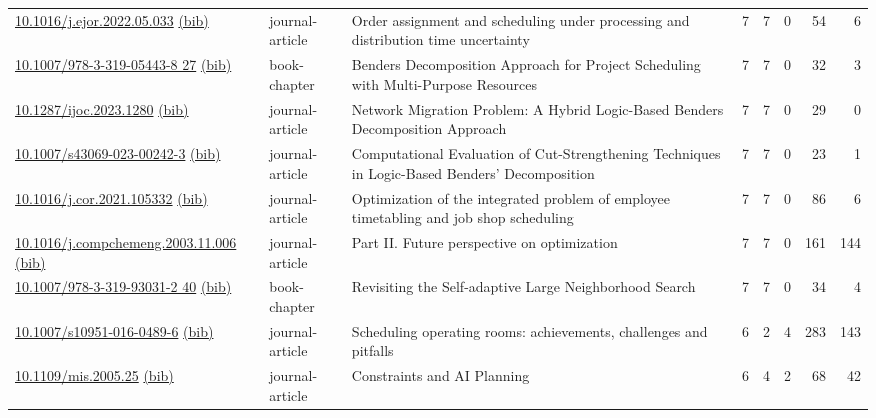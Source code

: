 {\begin{longtable}{p{5cm}lp{11cm}rrrrr}
\href{http://dx.doi.org/10.1016/j.ejor.2022.05.033}{10.1016/j.ejor.2022.05.033} \href{https://www.doi2bib.org/bib/10.1016/j.ejor.2022.05.033}{(bib)} & journal-article & Order assignment and scheduling under processing and distribution time uncertainty & 7 & 7 & 0 & 54 & 6 \\
\href{http://dx.doi.org/10.1007/978-3-319-05443-8_27}{10.1007/978-3-319-05443-8 27} \href{https://www.doi2bib.org/bib/10.1007/978-3-319-05443-8_27}{(bib)} & book-chapter & Benders Decomposition Approach for Project Scheduling with Multi-Purpose Resources & 7 & 7 & 0 & 32 & 3 \\
\href{http://dx.doi.org/10.1287/ijoc.2023.1280}{10.1287/ijoc.2023.1280} \href{https://www.doi2bib.org/bib/10.1287/ijoc.2023.1280}{(bib)} & journal-article & Network Migration Problem: A Hybrid Logic-Based Benders Decomposition Approach & 7 & 7 & 0 & 29 & 0 \\
\href{http://dx.doi.org/10.1007/s43069-023-00242-3}{10.1007/s43069-023-00242-3} \href{https://www.doi2bib.org/bib/10.1007/s43069-023-00242-3}{(bib)} & journal-article & Computational Evaluation of Cut-Strengthening Techniques in Logic-Based Benders' Decomposition & 7 & 7 & 0 & 23 & 1 \\
\href{http://dx.doi.org/10.1016/j.cor.2021.105332}{10.1016/j.cor.2021.105332} \href{https://www.doi2bib.org/bib/10.1016/j.cor.2021.105332}{(bib)} & journal-article & Optimization of the integrated problem of employee timetabling and job shop scheduling & 7 & 7 & 0 & 86 & 6 \\
\href{http://dx.doi.org/10.1016/j.compchemeng.2003.11.006}{10.1016/j.compchemeng.2003.11.006} \href{https://www.doi2bib.org/bib/10.1016/j.compchemeng.2003.11.006}{(bib)} & journal-article & Part II. Future perspective on optimization & 7 & 7 & 0 & 161 & 144 \\
\href{http://dx.doi.org/10.1007/978-3-319-93031-2_40}{10.1007/978-3-319-93031-2 40} \href{https://www.doi2bib.org/bib/10.1007/978-3-319-93031-2_40}{(bib)} & book-chapter & Revisiting the Self-adaptive Large Neighborhood Search & 7 & 7 & 0 & 34 & 4 \\
\href{http://dx.doi.org/10.1007/s10951-016-0489-6}{10.1007/s10951-016-0489-6} \href{https://www.doi2bib.org/bib/10.1007/s10951-016-0489-6}{(bib)} & journal-article & Scheduling operating rooms: achievements, challenges and pitfalls & 6 & 2 & 4 & 283 & 143 \\
\href{http://dx.doi.org/10.1109/mis.2005.25}{10.1109/mis.2005.25} \href{https://www.doi2bib.org/bib/10.1109/mis.2005.25}{(bib)} & journal-article & Constraints and AI Planning & 6 & 4 & 2 & 68 & 42 \\

\end{longtable}}
